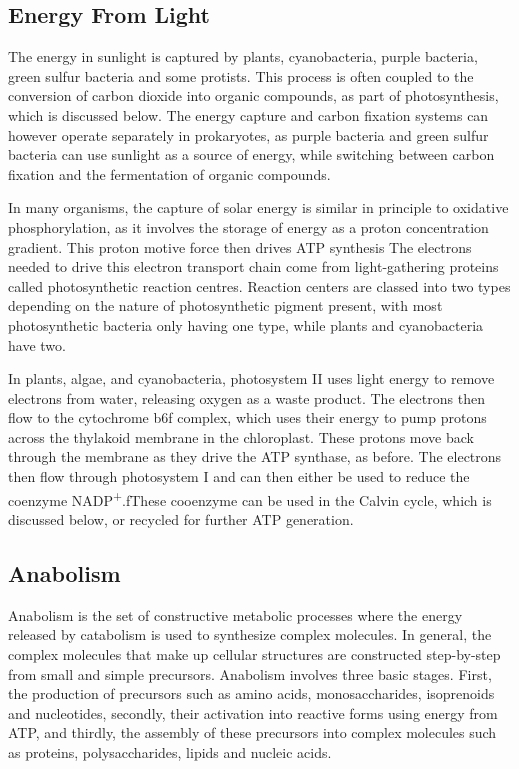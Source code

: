 \hypertarget{energy-from-light}{%
\subsection{Energy From Light}\label{energy-from-light}}

The energy in sunlight is captured by plants, cyanobacteria, purple bacteria, green sulfur bacteria and some protists. This process is often coupled to the conversion of carbon dioxide into organic compounds, as part of photosynthesis, which is discussed below. The energy capture and carbon fixation systems can however operate separately in prokaryotes, as purple bacteria and green sulfur bacteria can use sunlight as a source of energy, while switching between carbon fixation and the fermentation of organic compounds.

In many organisms, the capture of solar energy is similar in principle to oxidative phosphorylation, as it involves the storage of energy as a proton concentration gradient. This proton motive force then drives ATP synthesis The electrons needed to drive this electron transport chain come from light-gathering proteins called photosynthetic reaction centres. Reaction centers are classed into two types depending on the nature of photosynthetic pigment present, with most photosynthetic bacteria only having one type, while plants and cyanobacteria have two.

In plants, algae, and cyanobacteria, photosystem II uses light energy to remove electrons from water, releasing oxygen as a waste product. The electrons then flow to the cytochrome b6f complex, which uses their energy to pump protons across the thylakoid membrane in the chloroplast. These protons move back through the membrane as they drive the ATP synthase, as before. The electrons then flow through photosystem I and can then either be used to reduce the coenzyme NADP\textsuperscript{+}.fThese cooenzyme can be used in the Calvin cycle, which is discussed below, or recycled for further ATP generation.

\hypertarget{anabolism}{%
\subsection{Anabolism}\label{anabolism}}

Anabolism is the set of constructive metabolic processes where the energy released by catabolism is used to synthesize complex molecules. In general, the complex molecules that make up cellular structures are constructed step-by-step from small and simple precursors. Anabolism involves three basic stages. First, the production of precursors such as amino acids, monosaccharides, isoprenoids and nucleotides, secondly, their activation into reactive forms using energy from ATP, and thirdly, the assembly of these precursors into complex molecules such as proteins, polysaccharides, lipids and nucleic acids.

